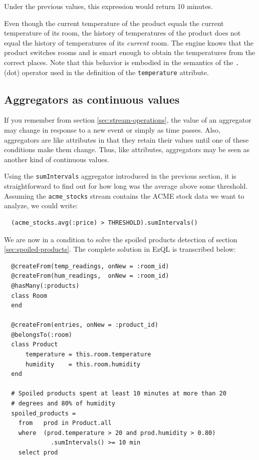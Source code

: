 \documentclass{report}
\begin{document}
Under the previous values, this expression would return 10 minutes.

Even though the current temperature of the product equals the current
temperature of its room, the history of temperatures of the product
does not equal the history of temperatures of its \emph{current}
room. The engine knows that the product switches rooms and is smart
enough to obtain the temperatures from the correct places. Note that
this behavior is embodied in the semantics of the \verb=.= (dot)
operator used in the definition of the \verb=temperature=
attribute.

\subsection{Aggregators as continuous values}
\label{sec:aggregators-continuous-values}

If you remember from section \ref{sec:stream-operations}, the value of
an aggregator may change in response to a new event or simply as time
passes. Also, aggregators are like attributes in that they retain
their values until one of these conditions make them change. Thus,
like attributes, aggregators may be seen as another kind of continuous
values.

Using the \verb=sumIntervals= aggregator introduced in the previous
section, it is straightforward to find out for how long was the
average above some threshold. Assuming the \verb=acme_stocks= stream
contains the ACME stock data we want to analyze, we could write:

\begin{lstlisting}
  (acme_stocks.avg(:price) > THRESHOLD).sumIntervals()
\end{lstlisting}


We are now in a condition to solve the spoiled products detection of
section \ref{sec:spoiled-products}. The complete solution in EzQL is
transcribed below:


\begin{lstlisting}
  @createFrom(temp_readings, onNew = :room_id)
  @createFrom(hum_readings,  onNew = :room_id)
  @hasMany(:products)
  class Room
  end

  @createFrom(entries, onNew = :product_id)
  @belongsTo(:room)
  class Product
      temperature = this.room.temperature
      humidity    = this.room.humidity
  end

  # Spoiled products spent at least 10 minutes at more than 20
  # degrees and 80% of humidity
  spoiled_products =
    from   prod in Product.all
    where  (prod.temperature > 20 and prod.humidity > 0.80)
             .sumIntervals() >= 10 min
    select prod
\end{lstlisting}
\end{document}
